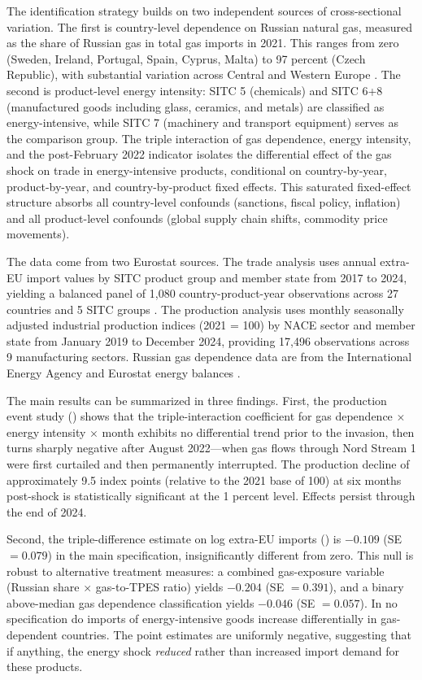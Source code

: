 \documentclass[12pt]{article}
\begin{document}
The identification strategy builds on two independent sources of cross-sectional variation. The first is country-level dependence on Russian natural gas, measured as the share of Russian gas in total gas imports in 2021. This ranges from zero (Sweden, Ireland, Portugal, Spain, Cyprus, Malta) to 97 percent (Czech Republic), with substantial variation across Central and Western Europe \citep{iea2022}. The second is product-level energy intensity: SITC 5 (chemicals) and SITC 6+8 (manufactured goods including glass, ceramics, and metals) are classified as energy-intensive, while SITC 7 (machinery and transport equipment) serves as the comparison group. The triple interaction of gas dependence, energy intensity, and the post-February 2022 indicator isolates the differential effect of the gas shock on trade in energy-intensive products, conditional on country-by-year, product-by-year, and country-by-product fixed effects. This saturated fixed-effect structure absorbs all country-level confounds (sanctions, fiscal policy, inflation) and all product-level confounds (global supply chain shifts, commodity price movements).

The data come from two Eurostat sources. The trade analysis uses annual extra-EU import values by SITC product group and member state from 2017 to 2024, yielding a balanced panel of 1,080 country-product-year observations across 27 countries and 5 SITC groups \citep{eurostat2023}. The production analysis uses monthly seasonally adjusted industrial production indices (2021 = 100) by NACE sector and member state from January 2019 to December 2024, providing 17,496 observations across 9 manufacturing sectors. Russian gas dependence data are from the International Energy Agency and Eurostat energy balances \citep{iea2022}.

The main results can be summarized in three findings. First, the production event study () shows that the triple-interaction coefficient for gas dependence $\times$ energy intensity $\times$ month exhibits no differential trend prior to the invasion, then turns sharply negative after August 2022---when gas flows through Nord Stream 1 were first curtailed and then permanently interrupted. The production decline of approximately 9.5 index points (relative to the 2021 base of 100) at six months post-shock is statistically significant at the 1 percent level. Effects persist through the end of 2024.

Second, the triple-difference estimate on log extra-EU imports () is $-0.109$ (SE $= 0.079$) in the main specification, insignificantly different from zero. This null is robust to alternative treatment measures: a combined gas-exposure variable (Russian share $\times$ gas-to-TPES ratio) yields $-0.204$ (SE $= 0.391$), and a binary above-median gas dependence classification yields $-0.046$ (SE $= 0.057$). In no specification do imports of energy-intensive goods increase differentially in gas-dependent countries. The point estimates are uniformly negative, suggesting that if anything, the energy shock \textit{reduced} rather than increased import demand for these products.
\end{document}
